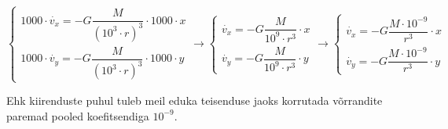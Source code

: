 \begin{flushleft}
\vspace{5mm}

\begin{equation}
\begin{cases}
1000 \cdot \dot{v_{x}}=-G\dfrac{M}{(10^{3} \cdot r)^{3}}\cdot 1000 \cdot x\\
1000 \cdot \dot{v_{y}}=-G\dfrac{M}{(10^{3} \cdot r)^{3}}\cdot 1000 \cdot y
\end{cases}
\longrightarrow
\begin{cases}
\dot{v_{x}}=-G\dfrac{M}{10^{9} \cdot r^{3}} \cdot x\\
\dot{v_{y}}=-G\dfrac{M}{10^{9} \cdot r^{3}} \cdot y
\end{cases}
\longrightarrow
\begin{cases}
\dot{v_{x}}=-G\dfrac{M \cdot 10^{-9}}{r^{3}}\cdot x\\
\dot{v_{y}}=-G\dfrac{M \cdot 10^{-9}}{r^{3}}\cdot y
\end{cases}
\end{equation}

Ehk kiirenduste puhul tuleb meil eduka teisenduse jaoks korrutada võrrandite paremad pooled koefitsendiga $10^{-9}$.

\end{flushleft}